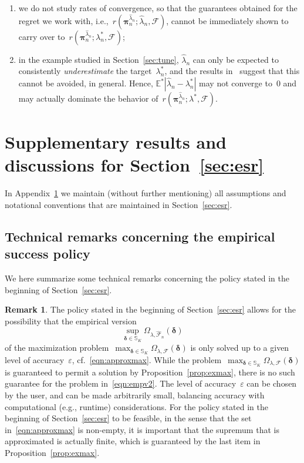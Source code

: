 \documentclass[11pt, a4paper]{article}
\theoremstyle{definition}
\newtheorem{remark}{Remark}[section]
\begin{document}
\begin{enumerate}
\item we do not study rates of convergence, so that the guarantees obtained for the regret we work with, i.e.,~$r(\bm{\pi}^{  \hat{\lambda}_n}_n;\hat{\lambda}_n, \mathcal{F})$, cannot be immediately shown to carry over to~$r(\bm{\pi}^{  \hat{\lambda}_n}_n; \lambda^*_n, \mathcal{F})$;
\item in the example studied in Section~\ref{sec:tune}, $\hat{\lambda}_n$ can only be expected to consistently \emph{underestimate} the target~$\lambda^*_n$, and the results in~\cite{lsun} suggest that this cannot be avoided, in general. Hence, $\mathbb{E}^*|\hat{\lambda}_n - \lambda^*_n|$ may not converge to~$0$ and may actually dominate the behavior of~$r(\bm{\pi}^{  \hat{\lambda}_n}_n; \lambda^*, \mathcal{F})$.
\end{enumerate} 

\section{Supplementary results and discussions for Section~\ref{sec:esr}}\label{sec:suppesr}

In Appendix~\ref{sec:suppesr} we maintain (without further mentioning) all assumptions and notational conventions that are maintained in Section~\ref{sec:esr}.

\subsection{Technical remarks concerning the empirical success policy}\label{sec:techpol}

We here summarize some technical remarks concerning the policy stated in the beginning of Section~\ref{sec:esr}.

\begin{remark}
The policy stated in the beginning of Section~\ref{sec:esr} allows for the possibility that the empirical version 
\begin{equation}\label{eqn:empv2}
\sup_{\bm{\delta} \in \mathbb{S}_K} \Omega_{\lambda, \hat{\mathcal{F}}_n}(\bm{\delta})
\end{equation}
of the maximization problem~$\max_{\bm{\delta} \in \mathbb{S}_K} \Omega_{\lambda, \mathcal{F}}(\bm{\delta})$ is only solved up to a given level of accuracy~$\varepsilon$, cf.~\eqref{eqn:approxmax}. While the problem~$\max_{\bm{\delta} \in \mathbb{S}_K} \Omega_{\lambda, \mathcal{F}}(\bm{\delta})$  is guaranteed to permit a solution by Proposition~\ref{prop:exmax}, there is no such guarantee for the problem in~\eqref{eqn:empv2}. The level of accuracy~$\varepsilon$ can be chosen by the user, and can be made arbitrarily small, balancing accuracy with computational (e.g., runtime) considerations. For the policy stated in the beginning of Section~\ref{sec:esr} to be feasible, in the sense that the set in~\eqref{eqn:approxmax} is non-empty, it is important that the supremum that is approximated is actually finite, which is guaranteed by the last item in Proposition~\ref{prop:exmax}.
\end{remark}
\end{document}
